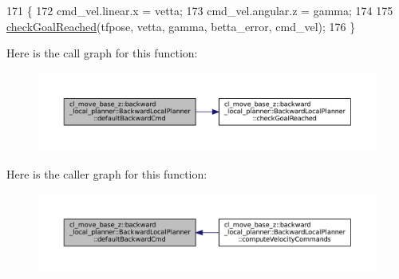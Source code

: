 \begin{DoxyCode}
171     \{
172         cmd\_vel.linear.x = vetta;
173         cmd\_vel.angular.z = gamma;
174 
175         \hyperlink{classcl__move__base__z_1_1backward__local__planner_1_1BackwardLocalPlanner_a6c4363e82119a6a8a5a3bfe309280898}{checkGoalReached}(tfpose, vetta, gamma, betta\_error, cmd\_vel);
176     \}
\end{DoxyCode}
Here is the call graph for this function\+:
\nopagebreak
\begin{figure}[H]
\begin{center}
\leavevmode
\includegraphics[width=350pt]{classcl__move__base__z_1_1backward__local__planner_1_1BackwardLocalPlanner_a1ebd69a028a22e3573e98f89d593f97d_cgraph}
\end{center}
\end{figure}
Here is the caller graph for this function\+:
\nopagebreak
\begin{figure}[H]
\begin{center}
\leavevmode
\includegraphics[width=350pt]{classcl__move__base__z_1_1backward__local__planner_1_1BackwardLocalPlanner_a1ebd69a028a22e3573e98f89d593f97d_icgraph}
\end{center}
\end{figure}
\mbox{\label{classcl__move__base__z_1_1backward__local__planner_1_1BackwardLocalPlanner_a9e8921ca8ce379ca8ba321f82ca23cdc}} 
